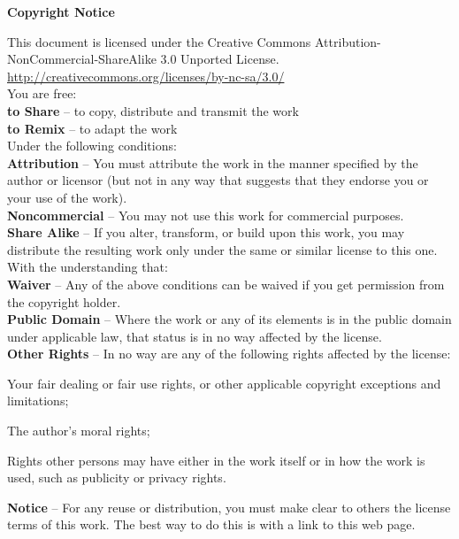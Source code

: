 \begin{center}
\large\textbf{Copyright Notice}
\end{center}

\small
\noindent
This document is licensed under the Creative Commons Attribution-NonCommercial-ShareAlike 3.0 Unported License. \url{http://creativecommons.org/licenses/by-nc-sa/3.0/}
\\[0.3cm]
You are free:
\\
\textbf{to Share} -- to copy, distribute and transmit the work
\\
\textbf{to Remix} -- to adapt the work
\\[0.3cm]
Under the following conditions:
\\
\textbf{Attribution} -- You must attribute the work in the manner specified by the author or licensor (but not in any way that suggests that they endorse you or your use of the work).
\\
\textbf{Noncommercial} -- You may not use this work for commercial purposes.
\\
\textbf{Share Alike} -- If you alter, transform, or build upon this work, you may distribute the resulting work only under the same or similar license to this one.
\\[0.3cm]
With the understanding that:
\\
\textbf{Waiver} -- Any of the above conditions can be waived if you get permission from the copyright holder.
\\
\textbf{Public Domain} -- Where the work or any of its elements is in the public domain under applicable law, that status is in no way affected by the license.
\\
\textbf{Other Rights} -- In no way are any of the following rights affected by the license:
\begin{itemize*}
	\item Your fair dealing or fair use rights, or other applicable copyright exceptions and limitations;
	\item The author's moral rights;
	\item Rights other persons may have either in the work itself or in how the work is used, such as publicity or privacy rights.
\end{itemize*}
\textbf{Notice} -- For any reuse or distribution, you must make clear to others the license terms of this work. The best way to do this is with a link to this web page.